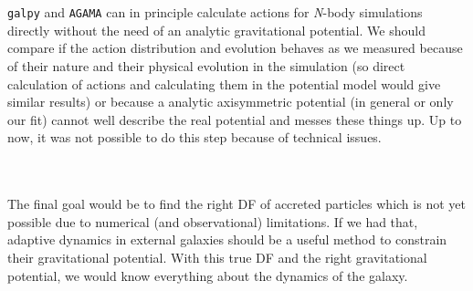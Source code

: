 \\\\
\texttt{galpy} and \texttt{AGAMA} \citep{Vasiliev...AGAMA...2019} can in principle calculate actions for \textit{N}-body simulations directly without the need of an analytic gravitational potential. We should compare if the action distribution and evolution behaves as we measured because of their nature and their physical evolution in the simulation (so direct calculation of actions and calculating them in the potential model would give similar results) or because a analytic axisymmetric potential (in general or only our fit) cannot well describe the real potential and messes these things up. Up to now, it was not possible to do this step because of technical issues. 

\\\\The final goal would be to find the right \ac{DF} of accreted particles which is not yet possible due to numerical (and observational) limitations. If we had that, adaptive dynamics in external galaxies should be a useful method to constrain their gravitational potential. With this true \ac{DF} and the right gravitational potential, we would know everything about the dynamics of the galaxy.

